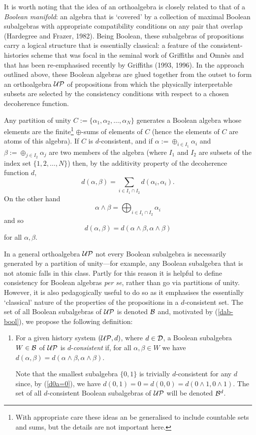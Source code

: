 \documentclass[12pt]{article}
\newcounter{def-number}[section]
\newcounter{defn}
\newenvironment{defn}{\medskip\noindent\stepcounter{def-number}
\nopagebreak[4]{\em Definition \arabic{section}.\arabic{def-number}}
\begin{enumerate}\setlength{\topsep}{-0pt}}%
{\end{enumerate}}
\newcommand{\beq}{\begin{equation}}
\newcommand{\eeq}{\end{equation}}
\newcommand{\eq}[1]{(\ref{#1})}
\renewcommand{\a}{\alpha}                   %
\renewcommand{\b}{\beta}                    %
\newcommand{\B}{{\cal B}}
\newcommand{\Bd}{{\cal B}^d}
\newcommand{\D}{{\cal D}}
\newcommand{\UP}{{\cal UP}}
\begin{document}
	It is worth noting that the idea of an orthoalgebra is closely
related to that of a {\em Boolean manifold\/}: an algebra that is
`covered' by a collection of maximal Boolean subalgebras with
appropriate compatibility conditions on any pair that overlap
(Hardegree and Frazer, 1982). Being Boolean, these subalgebras of
propositions carry a logical structure that is essentially
classical: a feature of the consistent-histories scheme that was
focal in the seminal work of Griffiths and Omn\`es and that has been
re-emphasised recently by Griffiths (1993, 1996).  In the approach
outlined above, these Boolean algebras are glued together from the
outset to form an orthoalgebra $\UP$ of propositions from which the
physically interpretable subsets are selected by the consistency
conditions with respect to a chosen decoherence function.

	Any partition of unity $C:=\{\a_1,\a_2,\ldots,\a_N\}$ generates
a Boolean algebra whose elements are the finite\footnote{With
appropriate care these ideas an be generalised to include countable
sets and sums, but the details are not important here.}
$\oplus$-sums of elements of $C$ (hence the elements of $C$ are
atoms of this algebra).  If $C$ is $d$-consistent, and if
$\a:=\oplus_{i\in I_1}\a_i$ and $\b:=\oplus_{j\in I_2}\a_j$ are two
members of the algebra (where $I_1$ and $I_2$ are subsets of the
index set $\{1,2,\ldots,N\}$) then, by the additivity property of
the decoherence function $d$,
\beq
	d(\a,\b)=\sum_{i\in I_1\cap I_2}d(\a_i,\a_i).
\eeq
On the other hand
\beq
	\a\land\b=\bigoplus_{i\in I_1\cap I_2}\a_i
\eeq
and so
\beq
		d(\a,\b)=d(\a\land\b,\a\land\b)		\label{dab-bool}
\eeq
for all $\a,\b$.

	In a general orthoalgebra $\UP$ not every Boolean subalgebra is
necessarily generated by a partition of unity---for example, any
Boolean subalgebra that is not atomic falls in this class. Partly
for this reason it is helpful to define consistency for Boolean
algebras {\em per se\/}, rather than go via partitions of unity.
However, it is also pedagogically useful to do so as it emphasises
the essentially `classical' nature of the properties of the
propositions in a $d$-consistent set.  The set of all Boolean
subalgebras of $\UP$ is denoted $\B$ and, motivated by
\eq{dab-bool}, we propose the following definition:


\begin{defn}
\item[] {For a given history system $(\UP,d)$, where $d\in\D$, a Boolean
subalgebra $W\in\B$ of $\UP$ is $d$-{\em consistent} if,
for all $\a,\b\in W$ we have $d(\a,\b)=d(\a\land\b,\a\land\b)$.

	Note that the smallest subalgebra $\{0,1\}$ is trivially
$d$-consistent for any $d$ since, by \eq{d0a=0}, we have
$d(0,1)=0=d(0,0)=d(0\land1,0\land1)$.  The set of all $d$-consistent
Boolean subalgebras of $\UP$ will be denoted $\Bd$.  }
\end{defn}
\end{document}
